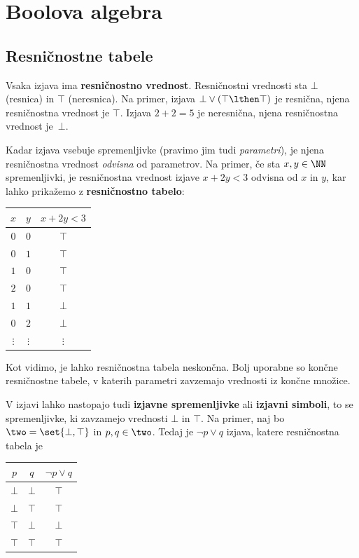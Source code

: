 \chapter{Boolova algebra}

\section{Resničnostne tabele}

Vsaka izjava ima \textbf{resničnostno vrednost}. Resničnostni vrednosti sta $\bot$
(resnica) in $\top$ (neresnica). Na primer, izjava $\bot \lor (\top \lthen \top)$ je resnična, njena resničnostna vrednost je $\top$. Izjava $2 + 2 = 5$ je neresnična, njena resničnostna vrednost je~$\bot$.

Kadar izjava vsebuje spremenljivke (pravimo jim tudi \emph{parametri}), je njena
resničnostna vrednost \emph{odvisna} od parametrov. Na primer, če sta $x, y \in \NN$ spremenljivki, je resničnostna vrednost izjave $x + 2 y < 3$ odvisna
od $x$ in $y$, kar lahko prikažemo z \textbf{resničnostno tabelo}:
%
\begin{center}
  \begin{tabular}{ccc}
    \toprule
    $x$ & $y$ & $x + 2 y < 3$ \\ \midrule
    $0$ & $0$ & $\top$ \\
    $0$ & $1$ & $\top$ \\
    $1$ & $0$ & $\top$ \\
    $2$ & $0$ & $\top$ \\
    $1$ & $1$ & $\bot$ \\
    $0$ & $2$ & $\bot$ \\
    $\vdots$ & $\vdots$ & $\vdots$ \\
    \bottomrule
  \end{tabular}
\end{center}
% 
Kot vidimo, je lahko resničnostna tabela neskončna. Bolj uporabne so končne resničnostne tabele, v katerih parametri zavzemajo vrednosti iz končne množice.

V izjavi lahko nastopajo tudi \textbf{izjavne spremenljivke} ali \textbf{izjavni simboli}, to se spremenljivke, ki zavzamejo vrednosti $\bot$ in $\top$.
Na primer, naj bo $\two = \set{\bot, \top}$ in $p, q \in \two$. Tedaj je $\neg p \lor q$ izjava, katere resničnostna tabela je
%
\begin{center}
  \begin{tabular}{ccc}
    \toprule
    $p$ & $q$ & $\neg p \lor q$ \\ \midrule
    $\bot$ & $\bot$ & $\top$ \\
    $\bot$ & $\top$ & $\top$ \\
    $\top$ & $\bot$ & $\bot$ \\
    $\top$ & $\top$ & $\top$ \\
    \bottomrule
  \end{tabular}
\end{center}

